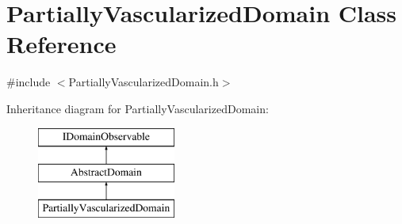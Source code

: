 \hypertarget{class_partially_vascularized_domain}{}\section{Partially\+Vascularized\+Domain Class Reference}
\label{class_partially_vascularized_domain}


{\ttfamily \#include $<$Partially\+Vascularized\+Domain.\+h$>$}

Inheritance diagram for Partially\+Vascularized\+Domain\+:\begin{figure}[H]
\begin{center}
\leavevmode
\includegraphics[height=3.000000cm]{d0/d32/class_partially_vascularized_domain}
\end{center}
\end{figure}
